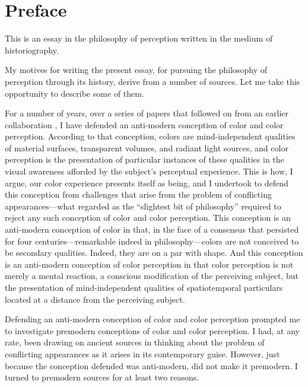 \chapter*{Preface} %
\label{cha:preface}


This is an essay in the philosophy of perception written in the medium of historiography. 

My motives for writing the present essay, for pursuing the philosophy of perception through its history, derive from a number of sources. Let me take this opportunity to describe some of them.

For a number of years, over a series of papers \citep{Kalderon:2006tg,Kalderon:2008fk,Kalderon:2007mr,Kalderon:2010fj,Kalderon:2011fk} that followed on from an earlier collaboration \citep{Hilbert:2000on}, I have defended an anti-modern conception of color and color perception. According to that conception, colors are mind-independent qualities of material surfaces, transparent volumes, and radiant light sources, and color perception is the presentation of particular instances of these qualities in the visual awareness afforded by the subject's perceptual experience. This is how, I argue, our color experience presents itself as being, and I undertook to defend this conception from challenges that arise from the problem of conflicting appearances---what \citet{Hume:1748zr} regarded as the ``slightest bit of philosophy'' required to reject any such conception of color and color perception. This conception is an anti-modern conception of color in that, in the face of a consensus that persisted for four centuries---remarkable indeed in philosophy---colors are not conceived to be secondary qualities. Indeed, they are on a par with shape. And this conception is an anti-modern conception of color perception in that color perception is not merely a mental reaction, a conscious modification of the perceiving subject, but the presentation of mind-independent qualities of spatiotemporal particulars located at a distance from the perceiving subject. 

Defending an anti-modern conception of color and color perception prompted me to investigate premodern conceptions of color and color perception. I had, at any rate, been drawing on ancient sources in thinking about the problem of conflicting appearances as it arises in its contemporary guise. However, just because the conception defended was anti-modern, did not make it premodern. I turned to premodern sources for at least two reasons. 

